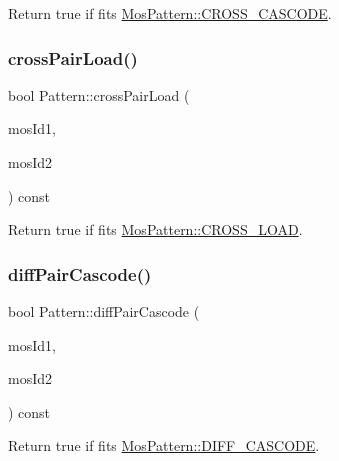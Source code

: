 Return true if fits \hyperlink{type_8h_af19eddb079bfea723256710b029c38e8adb952aa3809767bf108688a754ebbf2c}{Mos\+Pattern\+::\+C\+R\+O\+S\+S\+\_\+\+C\+A\+S\+C\+O\+DE}. 

\mbox{\label{classPattern_afe6e5456a639417112340f5f9d164b32}} 
\subsubsection{\texorpdfstring{cross\+Pair\+Load()}{crossPairLoad()}}
{\footnotesize\ttfamily bool Pattern\+::cross\+Pair\+Load (\begin{DoxyParamCaption}\item[{\hyperlink{type_8h_a581e8093e28e7362f2b6937296190676}{Index\+Type}}]{mos\+Id1,  }\item[{\hyperlink{type_8h_a581e8093e28e7362f2b6937296190676}{Index\+Type}}]{mos\+Id2 }\end{DoxyParamCaption}) const\hspace{0.3cm}{\ttfamily [private]}}



Return true if fits \hyperlink{type_8h_af19eddb079bfea723256710b029c38e8a19ddbfeab78ac1a4bbe1a186828c5d8d}{Mos\+Pattern\+::\+C\+R\+O\+S\+S\+\_\+\+L\+O\+AD}. 

\mbox{\label{classPattern_ad59ebd9a536a170735daf63126d71dea}} 
\subsubsection{\texorpdfstring{diff\+Pair\+Cascode()}{diffPairCascode()}}
{\footnotesize\ttfamily bool Pattern\+::diff\+Pair\+Cascode (\begin{DoxyParamCaption}\item[{\hyperlink{type_8h_a581e8093e28e7362f2b6937296190676}{Index\+Type}}]{mos\+Id1,  }\item[{\hyperlink{type_8h_a581e8093e28e7362f2b6937296190676}{Index\+Type}}]{mos\+Id2 }\end{DoxyParamCaption}) const\hspace{0.3cm}{\ttfamily [private]}}



Return true if fits \hyperlink{type_8h_af19eddb079bfea723256710b029c38e8a1b7b3de4c92d42d8311e04be030655af}{Mos\+Pattern\+::\+D\+I\+F\+F\+\_\+\+C\+A\+S\+C\+O\+DE}. 

